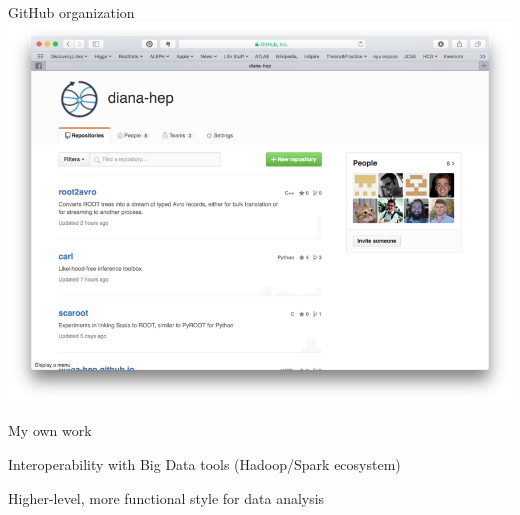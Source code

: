 \documentclass{beamer}
\begin{document}
\begin{frame}{GitHub organization}
\vspace{0.5 cm}
\includegraphics[width=\linewidth]{github_organization.png}
\end{frame}

\begin{frame}{My own work}
\vspace{0.5 cm}
\begin{center}
Interoperability with Big Data tools (Hadoop/Spark ecosystem)

\vspace{0.5 cm}
Higher-level, more functional style for data analysis
\end{center}
\end{frame}
\end{document}
